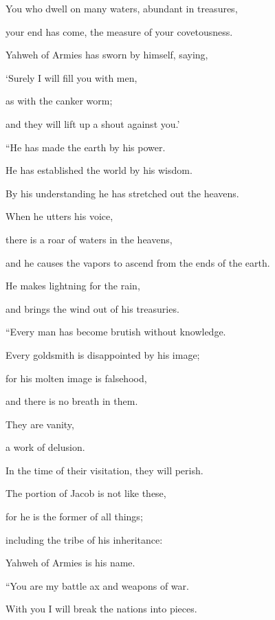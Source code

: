 {\par }{\Q {}You who dwell on many waters, abundant in treasures,
\par }{\QB your end has come, the measure of your covetousness.
\par }{\Q {}Yahweh of Armies has sworn by himself, saying,
\par }{\QB ‘Surely I will fill you with men,
\par }{\QB as with the canker worm;
\par }{\QB and they will lift up a shout against you.’
\par }{\BB \par }{\Q {}“He has made the earth by his power.
\par }{\QB He has established the world by his wisdom.
\par }{\QB By his understanding he has stretched out the heavens.
\par }{\Q {}When he utters his voice,
\par }{\QB there is a roar of waters in the heavens,
\par }{\QB and he causes the vapors to ascend from the ends of the earth.
\par }{\Q He makes lightning for the rain,
\par }{\QB and brings the wind out of his treasuries.
\par }{\BB \par }{\Q {}“Every man has become brutish without knowledge.
\par }{\QB Every goldsmith is disappointed by his image;
\par }{\Q for his molten image is falsehood,
\par }{\QB and there is no breath in them.
\par }{\Q {}They are vanity,
\par }{\QB a work of delusion.
\par }{\QB In the time of their visitation, they will perish.
\par }{\Q {}The portion of Jacob is not like these,
\par }{\QB for he is the former of all things;
\par }{\QB including the tribe of his inheritance:
\par }{\QB Yahweh of Armies is his name.
\par }{\BB \par }{\Q {}“You are my battle ax and weapons of war.
\par }{\QB With you I will break the nations into pieces.
}
